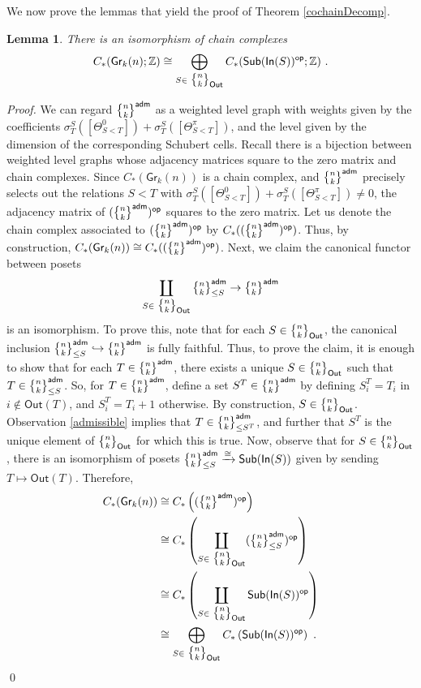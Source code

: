 \documentclass{article}
\newcommand{\msf}[1]{\mathsf{#1}}
\newcommand{\gr}{\msf{Gr}}
\newcommand{\nchoosek}{\textstyle\genfrac{\lbrace}{\rbrace}{0pt}{}}
\newcommand{\In}{\msf{In}}
\newcommand{\Out}{\msf{Out}}
\newcommand{\adm}{\msf{adm}}
\newcommand{\Sub}{\msf{Sub}}
\newcommand{\op}{\msf{op}}
\newtheorem{lemma}[theorem]{Lemma}
\theoremstyle{definition}
\begin{document}
We now prove the lemmas that yield the proof of Theorem \ref{cochainDecomp}.
\begin{lemma}\label{Sub}
    There is an isomorphism of chain complexes 
    $$C_*(\gr_k(n);\ZZ) \cong \bigoplus_{S \in \nchoosek{n}{k}_\msf{Out}} C_*(\msf{Sub}(\msf{In}(S))^\op;\ZZ)~.$$
\end{lemma}
{\it Proof.}
We can regard 
$\nchoosek{n}{k}^\adm$ as a weighted level graph with weights given by the coefficients
$\sigma^S_T([\Theta_{S<T}^0])+\sigma^S_T([\Theta_{S<T}^\pi])$, and the level given by the dimension of
the corresponding Schubert cells. Recall there is a bijection between weighted level graphs whose adjacency
matrices square to the zero matrix and chain complexes. Since $C_*(\gr_k(n))$ is a chain complex, and 
$\nchoosek{n}{k}^\adm$ precisely selects out the relations $S < T$ with 
$\sigma^S_T([\Theta_{S<T}^0])+\sigma^S_T([\Theta_{S<T}^\pi]) \neq 0$, the adjacency matrix of 
$(\nchoosek{n}{k}^\adm)^\op$ squares to the zero matrix. Let us denote the chain complex associated to 
$(\nchoosek{n}{k}^\adm)^\op$ by $ C_*((\nchoosek{n}{k}^\adm)^\op)$.  Thus, by construction, 
$C_*(\gr_k(n)) \cong C_*((\nchoosek{n}{k}^\adm)^\op)$.
Next, we claim the canonical functor between posets
$$\coprod_{S \in \nchoosek{n}{k}_\Out} \nchoosek{n}{k}^\adm_{\le S} \to \nchoosek{n}{k}^\adm$$
is an isomorphism.  To prove this, note that for each $S \in \nchoosek{n}{k}_\Out$, the canonical inclusion
$\nchoosek{n}{k}^\adm_{\le S} \hookrightarrow \nchoosek{n}{k}^\adm$ is fully faithful. Thus, to prove the
claim, it is enough to show that for each $T \in \nchoosek{n}{k}^\adm$, there exists a unique
$S \in \nchoosek{n}{k}_\Out$ such that $T \in \nchoosek{n}{k}^\adm_{\le S}$. So, for
$T \in \nchoosek{n}{k}^\adm$, define a set $S^T \in \nchoosek{n}{k}^\adm$ by defining 
$S^T_i = T_i$ in $i \not\in \Out(T)$, and $S^T_i = T_i+1$ otherwise. By construction, 
$S \in \nchoosek{n}{k}_\Out$. Observation \ref{admissible} implies that $T \in \nchoosek{n}{k}^\adm_{\le S^T}$,
and further that $S^T$ is the unique element of $\nchoosek{n}{k}_\Out$ for which this is true. 
Now, observe that for $S \in \nchoosek{n}{k}_\Out$,  there is an isomorphism of posets
$\nchoosek{n}{k}_{\le S}^\adm \xrightarrow{\cong} \Sub(\In(S))$ given by sending $T \mapsto \Out(T)$. 
Therefore, 
\begin{align*}
    C_*(\gr_k(n)) &\cong C_*\left((\nchoosek{n}{k}^\adm)^\op\right) \\
    &\cong C_*\left(\coprod_{S \in \nchoosek{n}{k}_\Out} (\nchoosek{n}{k}^\adm_{\le S})^\op\right) \\
    &\cong C_*\left(\coprod_{S \in \nchoosek{n}{k}_\Out} \Sub(\In(S))^\op\right) \\
    &\cong \bigoplus_{S \in \nchoosek{n}{k}_\Out} C_*\left( \Sub(\In(S))^\op\right)~.
\end{align*}
\qed \\
\end{document}
